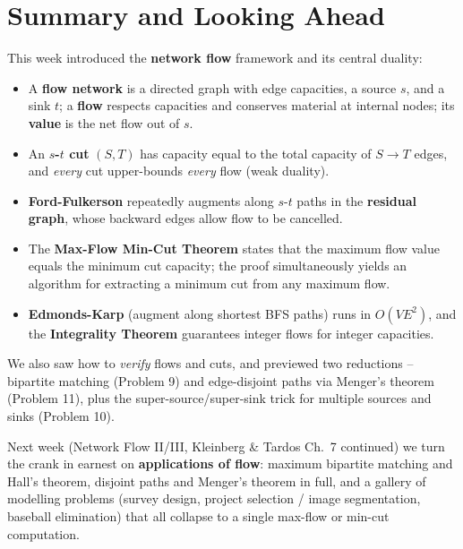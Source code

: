 \documentclass[11pt]{article}
\begin{document}
\section{Summary and Looking Ahead}

This week introduced the \textbf{network flow} framework and its central duality:

\begin{itemize}
    \item A \textbf{flow network} is a directed graph with edge capacities, a source $s$,
    and a sink $t$; a \textbf{flow} respects capacities and conserves material at internal
    nodes; its \textbf{value} is the net flow out of $s$.
    \item An \textbf{$s$-$t$ cut} $(S,T)$ has capacity equal to the total capacity of
    $S \to T$ edges, and \emph{every} cut upper-bounds \emph{every} flow (weak duality).
    \item \textbf{Ford-Fulkerson} repeatedly augments along $s$-$t$ paths in the
    \textbf{residual graph}, whose backward edges allow flow to be cancelled.
    \item The \textbf{Max-Flow Min-Cut Theorem} states that the maximum flow value equals
    the minimum cut capacity; the proof simultaneously yields an algorithm for extracting
    a minimum cut from any maximum flow.
    \item \textbf{Edmonds-Karp} (augment along shortest BFS paths) runs in $O(VE^2)$, and
    the \textbf{Integrality Theorem} guarantees integer flows for integer capacities.
\end{itemize}

We also saw how to \emph{verify} flows and cuts, and previewed two reductions -- bipartite
matching (Problem 9) and edge-disjoint paths via Menger's theorem (Problem 11), plus the
super-source/super-sink trick for multiple sources and sinks (Problem 10).

Next week (Network Flow II/III, Kleinberg \& Tardos Ch.\ 7 continued) we turn the crank in
earnest on \textbf{applications of flow}: maximum bipartite matching and Hall's theorem,
disjoint paths and Menger's theorem in full, and a gallery of modelling problems
(survey design, project selection / image segmentation, baseball elimination) that all
collapse to a single max-flow or min-cut computation.
\end{document}
